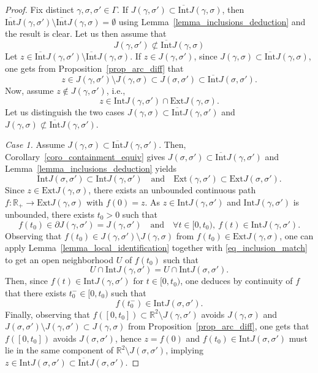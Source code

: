 \documentclass[a4paper, 11pt]{article} %
\theoremstyle{plain}
\newcommand{\Int}{\mathrm{Int}}
\newcommand{\clInt}{\overline{\mathrm{Int}}}
\newcommand{\Ext}{\mathrm{Ext}}
\newcommand{\R}{\mathbb{R}}
\newcommand{\1}{\mathds 1}
\numberwithin{equation}{section}
\begin{document}
\begin{proof}
    Fix distinct $\gamma,\sigma,\sigma'\in\Gamma$. If $J(\gamma,\sigma')\subset\clInt J(\gamma,\sigma)$, then $\clInt J(\gamma,\sigma')\setminus\clInt J(\gamma,\sigma)=\emptyset$ using Lemma~\ref{lemma_inclusions_deduction} and the result is clear. Let us then assume that
        \[J(\gamma,\sigma')\not\subset\clInt J(\gamma,\sigma)\]
    Let $z\in\clInt J(\gamma,\sigma')\setminus\clInt J(\gamma,\sigma)$. If $z\in J(\gamma,\sigma')$, since $J(\gamma,\sigma)\subset\clInt J(\gamma,\sigma)$, one gets from Proposition~\ref{prop_arc_diff} that
        \[z\in J(\gamma,\sigma')\setminus J(\gamma,\sigma)\subset J(\sigma,\sigma')\subset\clInt J(\sigma,\sigma').\]
    Now, assume $z\notin J(\gamma,\sigma')$, i.e.,
        \[z\in\Int J(\gamma,\sigma')\cap\Ext J(\gamma,\sigma).\]
    Let us distinguish the two cases $J(\gamma,\sigma)\subset\clInt J(\gamma,\sigma')$ and $J(\gamma,\sigma)\not\subset\clInt J(\gamma,\sigma')$.

    \emph{Case 1.} Assume $J(\gamma,\sigma)\subset \clInt J(\gamma,\sigma')$. Then, Corollary~\ref{coro_containment_equiv} gives $J(\sigma,\sigma')\subset\clInt J(\gamma,\sigma')$ and Lemma~\ref{lemma_inclusions_deduction} yields
        \begin{equation}
            \label{eq_inclusion_match}
            \Int J(\sigma,\sigma')\subset\Int J(\gamma,\sigma')\quad\text{and}\quad \Ext(\gamma,\sigma')\subset\Ext J(\sigma,\sigma').
        \end{equation}
    Since $z\in\Ext J(\gamma,\sigma)$, there exists an unbounded continuous path $f:\R_+\to\Ext J(\gamma,\sigma)$ with $f(0)=z$. As $z\in\Int J(\gamma,\sigma')$ and $\Int J(\gamma,\sigma')$ is unbounded, there exists $t_0>0$ such that
        \[f(t_0)\in\partial J(\gamma,\sigma')=J(\gamma,\sigma')\quad\text{and}\quad\forall t\in[0,t_0),~f(t)\in\Int J(\gamma,\sigma').\]
    Observing that $f(t_0)\in J(\gamma,\sigma')\setminus J(\gamma,\sigma)$ from $f(t_0)\in\Ext J(\gamma,\sigma)$, one can apply Lemma~\ref{lemma_local_identification} together with \eqref{eq_inclusion_match} to get an open neighborhood $U$ of $f(t_0)$ such that
        \[U\cap\Int J(\gamma,\sigma')=U\cap\Int J(\sigma,\sigma').\]
    Then, since $f(t)\in \Int J(\gamma,\sigma')$ for $t\in[0,t_0)$, one deduces by continuity of $f$ that there exists $t_0^-\in[0,t_0)$ such that
        \[f(t_0^-)\in\Int J(\sigma,\sigma').\]
    Finally, observing that $f([0,t_0])\subset\R^2\setminus J(\gamma,\sigma')$ avoids $J(\gamma,\sigma)$ and $J(\sigma,\sigma')\setminus J(\gamma,\sigma')\subset J(\gamma,\sigma)$ from Proposition~\ref{prop_arc_diff}, one gets that $f([0,t_0])$ avoids $J(\sigma,\sigma')$, hence $z=f(0)$ and $f(t_0)\in\Int J(\sigma,\sigma')$ must lie in the same component of $\R^2\setminus J(\sigma,\sigma')$, implying $z\in\Int J(\sigma,\sigma')\subset\clInt J(\sigma,\sigma')$.


\end{proof}
\end{document}
